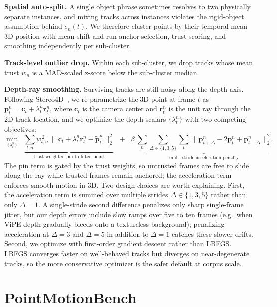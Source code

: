 \documentclass{llmxive}
\providecommand{\benchmarkname}{PointMotionBench\xspace}
\begin{document}
\noindent\textbf{Spatial auto-split.}
A single object phrase sometimes resolves to two physically separate instances, and mixing tracks across instances violates the rigid-object assumption behind $e_n(t)$. We therefore cluster points by their temporal-mean 3D position with mean-shift and run anchor selection, trust scoring, and smoothing independently per sub-cluster.

\noindent\textbf{Track-level outlier drop.}
Within each sub-cluster, we drop tracks whose mean trust $\bar w_n$ is a MAD-scaled z-score below the sub-cluster median.

\noindent\textbf{Depth-ray smoothing.}
Surviving tracks are still noisy along the depth axis. Following Stereo4D~\cite{stereo4d}, we re-parametrize the 3D point at frame $t$ as $\mathbf{p}_t^{n} = \mathbf{c}_t + \lambda_t^{n}\mathbf{r}_t^{n}$, where $\mathbf{c}_t$ is the camera center and $\mathbf{r}_t^{n}$ is the unit ray through the 2D track location, and we optimize the depth scalars $\{\lambda_t^{n}\}$ with two competing objectives:
\begin{equation}
\min_{\{\lambda_t^{n}\}}\;\;
\underbrace{\sum_{t,n} w_{t,n}^{\,2}\,\bigl\|\,\mathbf{c}_t + \lambda_t^{n}\mathbf{r}_t^{n} - \tilde{\mathbf{p}}_t^{n}\,\bigr\|_2^{2}}_{\text{trust-weighted pin to lifted point}}
\;\;+\;\;
\beta\;\underbrace{\sum_{n}\sum_{\Delta\in\{1,3,5\}}\sum_t \bigl\|\,\mathbf{p}_{t+\Delta}^{n} - 2\mathbf{p}_t^{n} + \mathbf{p}_{t-\Delta}^{n}\,\bigr\|_2^{2}}_{\text{multi-stride acceleration penalty}} .
\end{equation}
The pin term is gated by the trust weights, so untrusted frames are free to slide along the ray while trusted frames remain anchored; the acceleration term enforces smooth motion in 3D. Two design choices are worth explaining. First, the acceleration term is summed over multiple strides $\Delta\in\{1,3,5\}$ rather than only $\Delta=1$. A single-stride second difference penalizes only sharp single-frame jitter, but our depth errors include slow ramps over five to ten frames (e.g.\ when ViPE depth gradually bleeds onto a textureless background); penalizing acceleration at $\Delta=3$ and $\Delta=5$ in addition to $\Delta=1$ catches these slower drifts. Second, we optimize with first-order gradient descent rather than LBFGS. LBFGS converges faster on well-behaved tracks but diverges on near-degenerate tracks, so the more conservative optimizer is the safer default at corpus scale.

\section{\benchmarkname{}}
\label{subsec:appendix_3dworldbench}
\end{document}
